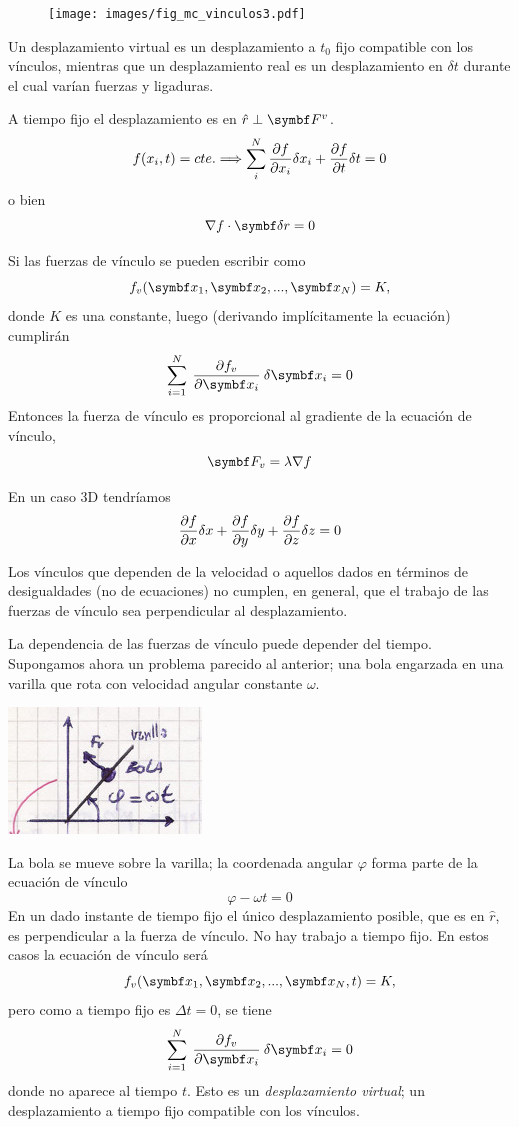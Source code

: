 \documentclass[10pt,oneside]{CBFT_book}
\begin{document}
\begin{figure}[!hbt]
	\begin{center}
	\texttt{[image: images/fig\_mc\_vinculos3.pdf]}	
	\end{center}
	\caption{}
\end{figure} 
Un desplazamiento virtual es un desplazamiento a $t_0$ fijo compatible con los vínculos,
mientras que un desplazamiento real es un desplazamiento en $\delta t$ durante el cual varían
fuerzas y ligaduras.

A tiempo fijo el desplazamiento es en $\hat{r} \perp \vb{F}^v$.
\[
	f(x_i,t) = cte. \Longrightarrow \sum_i^N \frac{\partial^{\hspace{-0.05em}} {f}}{\partial {x_i}^{\hspace{-0.05em}}} \delta x_i + \frac{\partial^{\hspace{-0.05em}} {f}}{\partial {t}^{\hspace{-0.05em}}} \delta t = 0 
\]
o bien
\[
	\nabla f \cdot \vb{\delta r} = 0
\]

Si las fuerzas de vínculo se pueden escribir como 
\[
	f_v(\vb{x}_1, \vb{x}_2, ..., \vb{x}_N ) = K,
\]
donde $K$ es una constante, luego (derivando implícitamente la ecuación) cumplirán
\[
	\sum_{i=1}^N \: \dpar{f_v}{\vb{x}_i}\:\delta{\vb{x}_i} = 0
\]
Entonces la fuerza de vínculo es proporcional al gradiente de la ecuación de vínculo,
\[
	\vb{F}_v = \lambda \nabla f
\]

En un caso 3D tendríamos
\[
	\frac{\partial^{\hspace{-0.05em}} {f}}{\partial {x}^{\hspace{-0.05em}}}\delta x + \frac{\partial^{\hspace{-0.05em}} {f}}{\partial {y}^{\hspace{-0.05em}}}\delta y + \frac{\partial^{\hspace{-0.05em}} {f}}{\partial {z}^{\hspace{-0.05em}}}\delta z = 0
\]

Los vínculos que dependen de la velocidad o aquellos dados en términos de desigualdades (no de ecuaciones) no cumplen,
en general, que el trabajo de las fuerzas de vínculo sea perpendicular al desplazamiento.

La dependencia de las fuerzas de vínculo puede depender del tiempo. Supongamos ahora un problema parecido al anterior; 
una bola engarzada en una varilla que rota con velocidad angular constante $\omega$.

\includegraphics[scale=0.4]{images/fig_mc_bola_varilla_rotante.jpg}

La bola se mueve sobre la varilla; la coordenada angular $\varphi$ forma parte de la ecuación de vínculo
\[
	\varphi - \omega t = 0
\]
En un dado instante de tiempo fijo el único desplazamiento posible, que es en $\hat{r}$, es perpendicular a la fuerza 
de vínculo. No hay trabajo a tiempo fijo.
En estos casos la ecuación de vínculo será
\[
	f_v(\vb{x}_1, \vb{x}_2, ..., \vb{x}_N, t ) = K,
\]
pero como a tiempo fijo es $\Delta t=0$, se tiene 
\[
	\sum_{i=1}^N \: \dpar{f_v}{\vb{x}_i}\:\delta{\vb{x}_i} = 0
\]
donde no aparece al tiempo $t$.
Esto es un {\it desplazamiento virtual}; un desplazamiento a tiempo fijo compatible con los vínculos.
\end{document}
